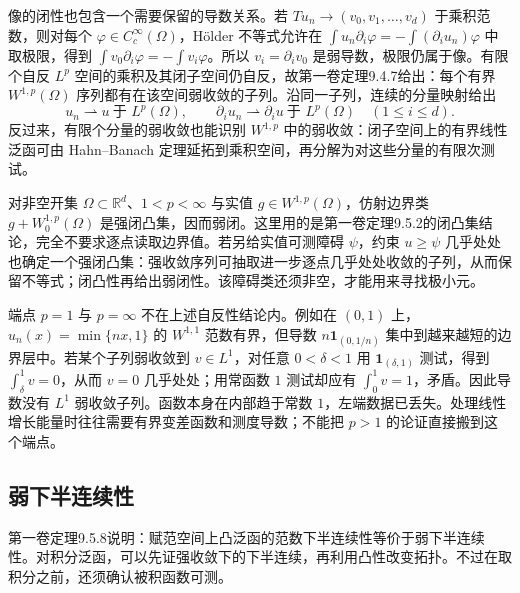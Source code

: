 \ProseParagraphBreak

像的闭性也包含一个需要保留的导数关系。若 \(Tu_n\to(v_0,v_1,\ldots,v_d)\) 于乘积范数，则对每个 \(\varphi\in C_c^\infty(\Omega)\)，Hölder 不等式允许在
\(\int u_n\partial_i\varphi=-\int(\partial_i u_n)\varphi\) 中取极限，得到
\(\int v_0\partial_i\varphi=-\int v_i\varphi\)。所以 \(v_i=\partial_i v_0\) 是弱导数，极限仍属于像。有限个自反 \(L^p\) 空间的乘积及其闭子空间仍自反，故第一卷定理9.4.7给出：每个有界 \(W^{1,p}(\Omega)\) 序列都有在该空间弱收敛的子列。沿同一子列，连续的分量映射给出
\[
 u_n\rightharpoonup u\ \text{于 }L^p(\Omega),\qquad
 \partial_i u_n\rightharpoonup\partial_i u\ \text{于 }L^p(\Omega)
 \quad(1\leq i\leq d).
\]
反过来，有限个分量的弱收敛也能识别 \(W^{1,p}\) 中的弱收敛：闭子空间上的有界线性泛函可由 Hahn--Banach 定理延拓到乘积空间，再分解为对这些分量的有限次测试。

\ProseParagraphBreak

对非空开集 \(\Omega\subset\mathbb R^d\)、\(1<p<\infty\) 与实值 \(g\in W^{1,p}(\Omega)\)，仿射边界类 \(g+W_0^{1,p}(\Omega)\) 是强闭凸集，因而弱闭。这里用的是第一卷定理9.5.2的闭凸集结论，完全不要求逐点读取边界值。若另给实值可测障碍 \(\psi\)，约束 \(u\ge\psi\) 几乎处处也确定一个强闭凸集：强收敛序列可抽取进一步逐点几乎处处收敛的子列，从而保留不等式；闭凸性再给出弱闭性。该障碍类还须非空，才能用来寻找极小元。

\ProseParagraphBreak

端点 \(p=1\) 与 \(p=\infty\) 不在上述自反性结论内。例如在 \((0,1)\) 上，\(u_n(x)=\min\{nx,1\}\) 的 \(W^{1,1}\) 范数有界，但导数 \(n\mathbf1_{(0,1/n)}\) 集中到越来越短的边界层中。若某个子列弱收敛到 \(v\in L^1\)，对任意 \(0<\delta<1\) 用 \(\mathbf1_{(\delta,1)}\) 测试，得到 \(\int_\delta^1v=0\)，从而 \(v=0\) 几乎处处；用常函数 \(1\) 测试却应有 \(\int_0^1v=1\)，矛盾。因此导数没有 \(L^1\) 弱收敛子列。函数本身在内部趋于常数 \(1\)，左端数据已丢失。处理线性增长能量时往往需要有界变差函数和测度导数；不能把 \(p>1\) 的论证直接搬到这个端点。

\subsection{弱下半连续性}
\label{b2:subsec:140404}

第一卷定理9.5.8说明：赋范空间上凸泛函的范数下半连续性等价于弱下半连续性。对积分泛函，可以先证强收敛下的下半连续，再利用凸性改变拓扑。不过在取积分之前，还须确认被积函数可测。

\ProseParagraphBreak

